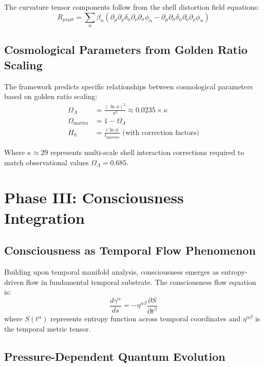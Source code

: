 \documentclass[12pt,a4paper]{article}
\begin{document}
The curvature tensor components follow from the shell distortion field equations:
\begin{equation}
R_{\mu\nu\rho\sigma} = \sum_{n} \beta_n \left( \partial_\mu \partial_\rho \delta_n \partial_\nu \partial_\sigma \phi_n - \partial_\mu \partial_\sigma \delta_n \partial_\nu \partial_\rho \phi_n \right)
\end{equation}

\subsection{Cosmological Parameters from Golden Ratio Scaling}

The framework predicts specific relationships between cosmological parameters based on golden ratio scaling:
\begin{align}
\Omega_{\Lambda} &= \frac{(\ln \phi)^2}{\pi^2} \approx 0.0235 \times \kappa \\
\Omega_{\text{matter}} &= 1 - \Omega_{\Lambda} \\
H_0 &= \frac{c \ln \phi}{t_{\text{universe}}} \text{ (with correction factors)}
\end{align}

Where $\kappa \approx 29$ represents multi-scale shell interaction corrections required to match observational values $\Omega_{\Lambda} = 0.685$.

\section{Phase III: Consciousness Integration}

\subsection{Consciousness as Temporal Flow Phenomenon}

Building upon temporal manifold analysis, consciousness emerges as entropy-driven flow in fundamental temporal substrate. The consciousness flow equation is:
\begin{equation}
\frac{d\gamma^{\alpha}}{ds} = -\eta^{\alpha\beta}\frac{\partial S}{\partial t^{\beta}}
\end{equation}
where $S(t^{\alpha})$ represents entropy function across temporal coordinates and $\eta^{\alpha\beta}$ is the temporal metric tensor.

\subsection{Pressure-Dependent Quantum Evolution}
\end{document}
